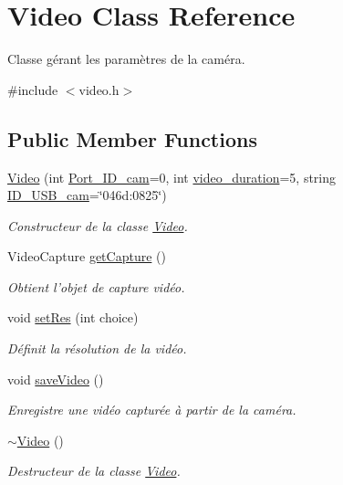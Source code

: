 \hypertarget{classVideo}{\section{Video Class Reference}
\label{classVideo}
}


Classe gérant les paramètres de la caméra.  




{\ttfamily \#include $<$video.\-h$>$}

\subsection*{Public Member Functions}
\begin{DoxyCompactItemize}
\item 
\hyperlink{classVideo_ad7b4d2253436139ce5c0393f376a0ada}{Video} (int \hyperlink{classVideo_ad2d7366bb2fe431b8551b2df2543ba8a}{Port\-\_\-\-I\-D\-\_\-cam}=0, int \hyperlink{classVideo_a1cd495d4d34fb5ce52237457508dbf40}{video\-\_\-duration}=5, string \hyperlink{classVideo_adf86ca32c0e37e971fcfa66a18c090f0}{I\-D\-\_\-\-U\-S\-B\-\_\-cam}=\char`\"{}046d\-:0825\char`\"{})
\begin{DoxyCompactList}\small\item\em Constructeur de la classe \hyperlink{classVideo}{Video}. \end{DoxyCompactList}\item 
Video\-Capture \hyperlink{classVideo_a127eb238f6a6a89d42a2882cc4bca40d}{get\-Capture} ()
\begin{DoxyCompactList}\small\item\em Obtient l'objet de capture vidéo. \end{DoxyCompactList}\item 
void \hyperlink{classVideo_a6c36f89de4bf88cc1d3fa810347babe5}{set\-Res} (int choice)
\begin{DoxyCompactList}\small\item\em Définit la résolution de la vidéo. \end{DoxyCompactList}\item 
void \hyperlink{classVideo_aecabd917bdfafcbe4dbe4db79484c67c}{save\-Video} ()
\begin{DoxyCompactList}\small\item\em Enregistre une vidéo capturée à partir de la caméra. \end{DoxyCompactList}\item 
\hyperlink{classVideo_aebf7e2a8fa2bbd79335b1cf35925d190}{$\sim$\-Video} ()
\begin{DoxyCompactList}\small\item\em Destructeur de la classe \hyperlink{classVideo}{Video}. \end{DoxyCompactList}\end{DoxyCompactItemize}
